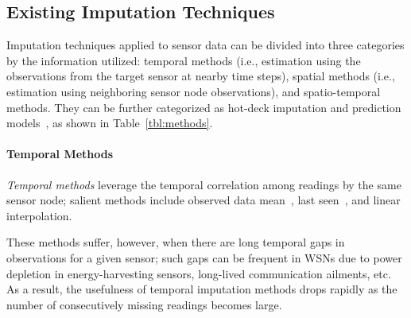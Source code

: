 
\subsection{Existing Imputation Techniques} \label{sec:existing_work}

Imputation techniques applied to sensor data can be divided into three categories by the information utilized:
temporal methods (i.e., estimation using the observations from the target sensor at nearby time steps), 
spatial methods (i.e., estimation using neighboring sensor node observations), 
and spatio-temporal methods. They can be further categorized as hot-deck imputation and prediction models~\cite{Garcia:KNNreview},
as shown in Table~\ref{tbl:methods}.


\paragraph{Temporal Methods}
{\em Temporal methods} leverage the temporal correlation among
readings by the same sensor node; salient methods include observed
data mean~\cite{madden2005tinydb}, last
seen~\cite{Granger:lastseen}, and linear interpolation. %

These methods
suffer, however, when there are long temporal gaps in observations for a given
sensor; such gaps can be frequent in WSNs due to power depletion in
energy-harvesting sensors, long-lived communication ailments, etc.  
As a result, the usefulness of temporal imputation
methods drops rapidly as the number of consecutively missing readings
becomes large.

